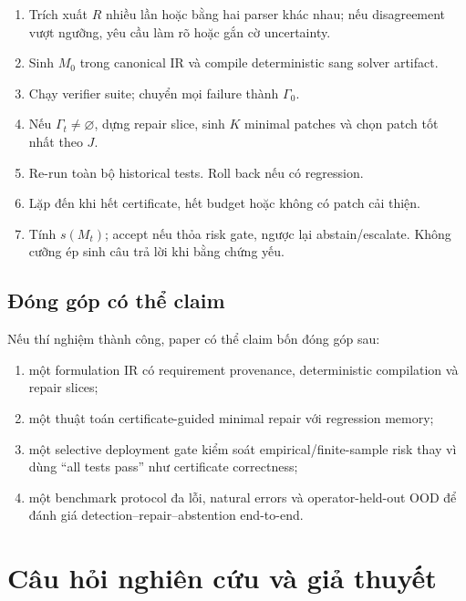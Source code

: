 \documentclass[11pt,a4paper]{article}
\begin{document}
\begin{enumerate}
  \item Trích xuất \(R\) nhiều lần hoặc bằng hai parser khác nhau; nếu disagreement vượt ngưỡng, yêu cầu làm rõ hoặc gắn cờ uncertainty.
  \item Sinh \(M_0\) trong canonical IR và compile deterministic sang solver artifact.
  \item Chạy verifier suite; chuyển mọi failure thành \(\Gamma_0\).
  \item Nếu \(\Gamma_t\neq\varnothing\), dựng repair slice, sinh \(K\) minimal patches và chọn patch tốt nhất theo \(J\).
  \item Re-run toàn bộ historical tests. Roll back nếu có regression.
  \item Lặp đến khi hết certificate, hết budget hoặc không có patch cải thiện.
  \item Tính \(s(M_t)\); \textsf{accept} nếu thỏa risk gate, ngược lại \textsf{abstain/escalate}. Không cưỡng ép sinh câu trả lời khi bằng chứng yếu.
\end{enumerate}

\subsection{Đóng góp có thể claim}

Nếu thí nghiệm thành công, paper có thể claim bốn đóng góp sau:

\begin{enumerate}
  \item một formulation IR có requirement provenance, deterministic compilation và repair slices;
  \item một thuật toán certificate-guided minimal repair với regression memory;
  \item một selective deployment gate kiểm soát empirical/finite-sample risk thay vì dùng ``all tests pass'' như certificate correctness;
  \item một benchmark protocol đa lỗi, natural errors và operator-held-out OOD để đánh giá detection--repair--abstention end-to-end.
\end{enumerate}

\section{Câu hỏi nghiên cứu và giả thuyết}
\end{document}
